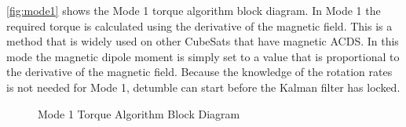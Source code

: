 \autoref{fig:mode1} shows the Mode 1 torque algorithm block diagram. In Mode 1 the required torque is calculated using the derivative of the magnetic field. This is a method that is widely used on other CubeSats  that have magnetic \ac{ACDS}. In this mode the magnetic dipole moment is simply set to a value that is proportional to the derivative of the magnetic field. Because the knowledge of the rotation rates is not needed for Mode 1, detumble can start before the Kalman filter has locked.

\begin{figure}[H]
    \centering
    \caption{Mode 1 Torque Algorithm Block Diagram}
    \label{fig:mode1}
\end{figure}
